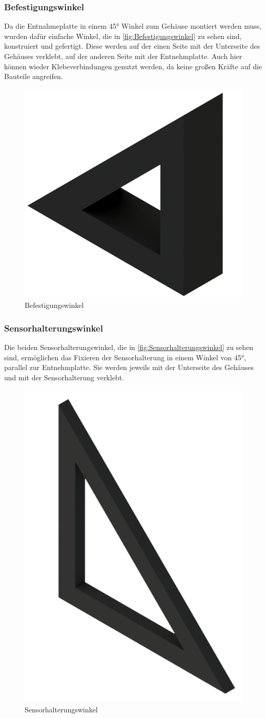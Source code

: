 \subsubsection{Befestigungswinkel}


Da die Entnahmeplatte in einem 45° Winkel zum Gehäuse montiert werden muss, wurden dafür einfache Winkel, die in \autoref{fig:Befestigungswinkel} zu sehen sind, konstruiert und gefertigt.
Diese werden auf der einen Seite mit der Unterseite des Gehäuses verklebt, auf der anderen Seite mit der Entnehmplatte.
Auch hier können wieder Klebeverbindungen genutzt werden, da keine großen Kräfte auf die Bauteile angreifen.

\begin{figure} [H]
    \centering
    \includegraphics[width=4 cm]{fig/mech/Winkel}
    \caption{Befestigungswinkel}
    \label{fig:Befestigungswinkel}
\end{figure}

\subsubsection{Sensorhalterungswinkel}


Die beiden Sensorhalterungswinkel, die in \autoref{fig:Sensorhalterungswinkel} zu sehen sind, ermöglichen das Fixieren der Sensorhalterung in einem Winkel von 45°, parallel zur
Entnehmplatte.
Sie werden jeweils mit der Unterseite des Gehäuses und mit der Sensorhalterung verklebt.

\begin{figure}[H]
    \centering
    \includegraphics[width=4 cm]{fig/mech/WinkelSensor}
    \caption{Sensorhalterungswinkel}
    \label{fig:Sensorhalterungswinkel}
\end{figure}


